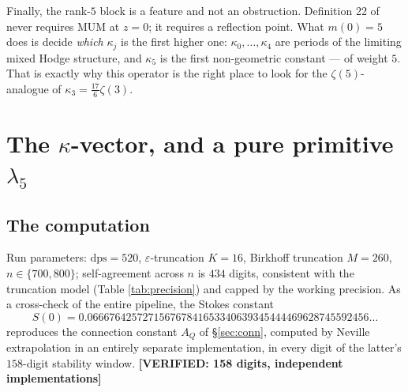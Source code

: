 \documentclass[11pt,reqno]{amsart}
\theoremstyle{plain}
\theoremstyle{definition}
\theoremstyle{remark}
\newcommand{\VER}[1]{{\normalfont\sffamily\bfseries[VERIFIED: #1]}}
\newcommand{\eps}{\varepsilon}
\newcommand{\dps}{\mathrm{dps}}
\begin{document}
Finally, the rank-$5$ block is a feature and not an obstruction. Definition 22 of \cite{BV}
never requires MUM at $z=0$; it requires a reflection point. What $m(0)=5$ does is decide
\emph{which} $\kappa_j$ is the first higher one: $\kappa_0,\dots,\kappa_4$ are periods of the
limiting mixed Hodge structure, and $\kappa_5$ is the first non-geometric constant --- of weight
$5$. That is exactly why this operator is the right place to look for the $\zeta(5)$-analogue of
$\kappa_3=\tfrac{17}{6}\zeta(3)$.

\section{The \texorpdfstring{$\kappa$}{kappa}-vector, and a pure primitive
\texorpdfstring{$\lambda_5$}{lambda 5}}\label{sec:kappavec}

\subsection{The computation}
Run parameters: $\dps=520$, $\eps$-truncation $K=16$, Birkhoff truncation $M=260$,
$n\in\{700,800\}$; self-agreement across $n$ is $434$ digits, consistent with the truncation
model (Table \ref{tab:precision}) and capped by the working precision. As a cross-check of the
entire pipeline, the Stokes constant
\[
  S(0)=0.066676425727156767841653340639345444469628745592456\ldots
\]
reproduces the connection constant $A_Q$ of \S\ref{sec:conn}, computed by Neville extrapolation
in an entirely separate implementation, in every digit of the latter's $158$-digit stability
window. \VER{158 digits, independent implementations}
\end{document}
